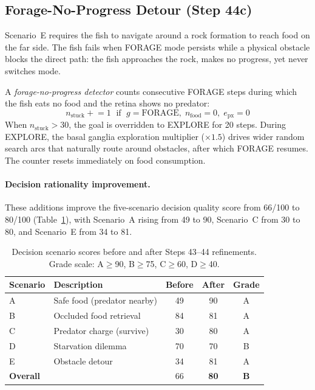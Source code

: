 \documentclass[11pt,a4paper]{article}
\begin{document}
\subsection{Forage-No-Progress Detour (Step 44c)}\label{sec:detour}

Scenario~E requires the fish to navigate around a rock formation to
reach food on the far side.  The fish fails when FORAGE mode persists
while a physical obstacle blocks the direct path: the fish approaches
the rock, makes no progress, yet never switches mode.

A \emph{forage-no-progress detector} counts consecutive FORAGE steps
during which the fish eats no food and the retina shows no predator:
\begin{equation}
  n_{\text{stuck}} \mathrel{+}= 1 \;\text{ if }\;
    g = \text{FORAGE},\; n_{\text{food}} = 0,\; e_{\text{px}} = 0
\end{equation}
When $n_{\text{stuck}} > 30$, the goal is overridden to EXPLORE for 20
steps.  During EXPLORE, the basal ganglia exploration multiplier
($\times 1.5$) drives wider random search arcs that naturally route
around obstacles, after which FORAGE resumes.  The counter resets
immediately on food consumption.

\paragraph{Decision rationality improvement.}
These additions improve the five-scenario decision quality score from
66/100 to 80/100 (Table~\ref{tab:scenario_improvement}), with
Scenario~A rising from 49 to 90, Scenario~C from 30 to 80, and
Scenario~E from 34 to 81.

\begin{table}[H]
\centering
\caption{Decision scenario scores before and after Steps 43--44
  refinements.  Grade scale: A$\geq$90, B$\geq$75, C$\geq$60, D$\geq$40.}
\label{tab:scenario_improvement}
\begin{tabular}{llccc}
\hline
Scenario & Description & Before & After & Grade \\
\hline
A & Safe food (predator nearby)   & 49  & 90  & A \\
B & Occluded food retrieval        & 84  & 81  & A \\
C & Predator charge (survive)      & 30  & 80  & A \\
D & Starvation dilemma             & 70  & 70  & B \\
E & Obstacle detour                & 34  & 81  & A \\
\hline
\textbf{Overall} & & 66 & \textbf{80} & \textbf{B} \\
\hline
\end{tabular}
\end{table}
\end{document}
